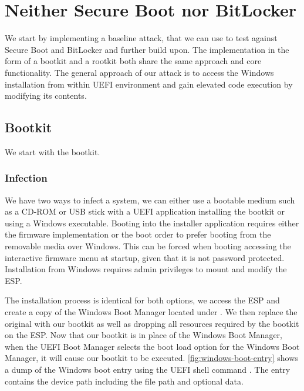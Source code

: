 
\section{Neither Secure Boot nor BitLocker}
\label{sec:attacks:neither}

We start by implementing a baseline attack, that we can use to test against Secure Boot and BitLocker and further build upon.
The implementation in the form of a bootkit and a rootkit both share the same approach and core functionality.
The general approach of our attack is to access the Windows installation from within \ac{UEFI} environment and gain elevated code execution by modifying its contents.

\subsection{Bootkit}
\label{sec:attacks:neither:bootkit}

We start with the bootkit.

\subsubsection{Infection}

We have two ways to infect a system, we can either use a bootable medium such as a CD-ROM or \ac{USB} stick with a \ac{UEFI} application installing the bootkit or using a Windows executable.
Booting into the installer application requires either the firmware implementation or the boot order to prefer booting from the removable media over Windows.
This can be forced when booting accessing the interactive firmware menu at startup, given that it is not password protected.
Installation from Windows requires admin privileges to mount and modify the \ac{ESP}.

The installation process is identical for both options, we access the \ac{ESP} and create a copy of the Windows Boot Manager located under .
We then replace the original with our bootkit as well as dropping all resources required by the bootkit on the \ac{ESP}.
Now that our bootkit is in place of the Windows Boot Manager, when the \ac{UEFI} Boot Manager selects the boot load option for the Windows Boot Manager, it will cause our bootkit to be executed.
\autoref{fig:windows-boot-entry} shows a dump of the Windows boot entry using the \ac{UEFI} shell command .
The entry contains the device path including the file path and optional data.


